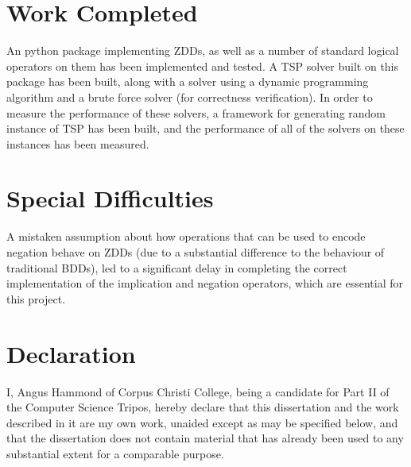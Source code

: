 \documentclass[12pt,a4paper,twoside,openright]{report}
\begin{document}
\section*{Work Completed}

An python package implementing ZDDs, as well as a number of standard logical operators on them has been implemented and tested. A TSP solver built on this package has been built, along with a solver using a dynamic programming algorithm and a brute force solver (for correctness verification). In order to measure the performance of these solvers, a framework for generating random instance of TSP has been built, and the performance of all of the solvers on these instances has been measured.

\section*{Special Difficulties}

A mistaken assumption about how operations that can be used to encode negation behave on ZDDs (due to a substantial difference to the behaviour of traditional BDDs), led to a significant delay in completing the correct implementation of the implication and negation operators, which are essential for this project.
 
\newpage
\section*{Declaration}

I, Angus Hammond of Corpus Christi College, being a candidate for Part II of the Computer
Science Tripos, hereby declare
that this dissertation and the work described in it are my own work,
unaided except as may be specified below, and that the dissertation
does not contain material that has already been used to any substantial
extent for a comparable purpose.

\medskip
{}

\tableofcontents

\listoffigures


\pagestyle{headings}
\end{document}
